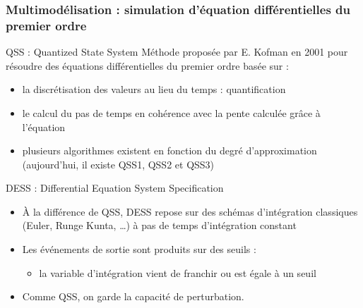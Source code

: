 \documentclass[xetex, compress, table, dvipsnames]{beamer}
\begin{document}
\begin{frame}
  \frametitle{Multimodélisation : simulation d'équation
    différentielles du premier ordre}
  \begin{block}{QSS : Quantized State System}
    Méthode proposée par E. Kofman en 2001 pour résoudre des équations
    différentielles du premier ordre basée sur :
    \begin{itemize}
    \item la discrétisation des valeurs au lieu du temps : quantification
    \item le calcul du pas de temps en cohérence avec la pente calculée
      grâce à l'équation
    \item plusieurs algorithmes existent en fonction du degré
      d'approximation (aujourd'hui, il existe QSS1, QSS2 et QSS3)
    \end{itemize}
  \end{block}
  \begin{block}{DESS : Differential Equation System Specification}
    \begin{itemize}
    \item À la différence de QSS, DESS repose sur des schémas
      d'intégration classiques (Euler, Runge Kunta, \ldots) à pas de temps
      d'intégration constant
    \item Les événements de sortie sont produits sur des seuils :
      \begin{itemize}
      \item la variable d'intégration vient de franchir ou est égale à un seuil
      \end{itemize}
    \item Comme QSS, on garde la capacité de perturbation.
    \end{itemize}
  \end{block}
\end{frame}
\end{document}
